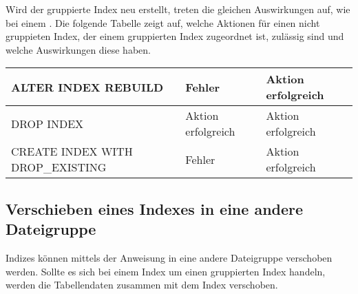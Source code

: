           Wird der gruppierte Index neu erstellt, treten die gleichen
          Auswirkungen auf, wie bei einem .
          Die folgende Tabelle zeigt auf, welche Aktionen für einen nicht
          gruppieten Index, der einem gruppierten Index zugeordnet ist, zulässig
          sind und welche Auswirkungen diese haben.
          \begin{center}
            \begin{small}
            \tablehead{
            }
            \tabletail {
              \hline
            }
            \tablelasttail {
              \hline
            }
              \begin{supertabular}{|p{7cm}|p{3.2cm}|p{3.75cm}|}
              ALTER INDEX REBUILD &  Fehler & Aktion erfolgreich \\
              \hline
              DROP INDEX & Aktion erfolgreich & Aktion erfolgreich \\
              \hline
              CREATE INDEX WITH DROP\_EXISTING & Fehler & Aktion erfolgreich \\
              \end{supertabular}
            \end{small}
          \end{center}
          \begin{literaturinternet}
            \item \cite{ms190645}
            \item \cite{ms177456}
          \end{literaturinternet}
      \subsection{Verschieben eines Indexes in eine andere Dateigruppe}
        Indizes können mittels der Anweisung  in eine andere Dateigruppe verschoben werden. Sollte
        es sich bei einem Index um einen gruppierten Index handeln, werden die
        Tabellendaten zusammen mit dem Index verschoben.
        
